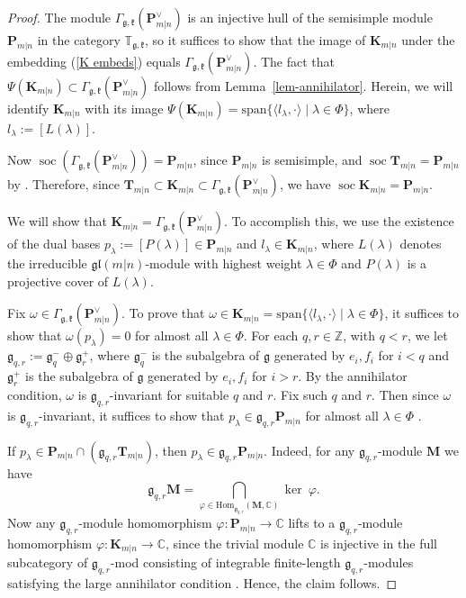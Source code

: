 \documentclass[12pt,oneside,english]{amsart}
\numberwithin{equation}{section}
\numberwithin{figure}{section}
\theoremstyle{plain}
\theoremstyle{plain}
\theoremstyle{remark}
\theoremstyle{definition}
\theoremstyle{plain}
\theoremstyle{remark}
\theoremstyle{definition}
\theoremstyle{plain}
\theoremstyle{plain}
\theoremstyle{definition}
\newcommand{\bT}{\mathbf{T}}
\newcommand{\bP}{\mathbf{P}}
\newcommand{\bK}{\mathbf{K}}
\newcommand{\bM}{\mathbf{M}}
\newcommand{\soc}{\operatorname{soc}}
\newcommand{\fg}{\mathfrak{g}}
\newcommand{\fk}{\mathfrak{k}}
\begin{document}
\begin{proof}

The module  $\Gamma_{\fg,\fk}(\bP_{m|n}^\vee)$  is an injective hull of the semisimple module $\bP_{m|n}$ in the category $\mathbb T_{\fg,\fk}$, so it suffices to show that the  image of  $\bK_{m|n}$ under the embedding (\ref{K embeds}) equals $\Gamma_{\fg,\fk}(\bP_{m|n}^\vee)$.
The fact that $\Psi(\bK_{m|n})\subset \Gamma_{\fg,\fk}(\bP_{m|n}^\vee)$ follows from Lemma~\ref{lem-annihilator}. Herein, we will identify $\bK_{m|n}$ with its image $\Psi(\bK_{m|n})=\mathrm{span}\{\langle l_{\lambda},\cdot\rangle\mid \lambda\in\Phi\}$, where $ l_\lambda:=[L(\lambda)]$.

Now $\soc(\Gamma_{\fg,\fk}(\bP_{m|n}^\vee))=\bP_{m|n}$, since $\bP_{m|n}$ is semisimple, and  $\soc\bT_{m|n}=\bP_{m|n}$ by \cite[Theorem 3.11]{CS}.
Therefore, since $\bT_{m|n}\subset\bK_{m|n}\subset\Gamma_{\fg,\fk}(\bP_{m|n}^\vee)$, we have $\soc\bK_{m|n}=\bP_{m|n}$.

We will show that  $\bK_{m|n}=\Gamma_{\fg,\fk}(\bP_{m|n}^\vee)$. To accomplish this, we  use the existence of the dual bases $p_\lambda:=[P(\lambda)]\in\bP_{m|n}$ and $l_\lambda\in\bK_{m|n}$, where
 $L(\lambda)$ denotes the irreducible $\mathfrak{gl}(m|n)$-module with highest weight $\lambda\in\Phi$ and $P(\lambda)$ is a projective cover of  $L(\lambda)$.

Fix $\omega\in \Gamma_{\fg,\fk}(\bP^{\vee}_{m|n})$. To prove that $\omega\in\bK_{m|n}=\mathrm{span}\{\langle l_{\lambda},\cdot\rangle\mid \lambda\in\Phi\}$, it suffices to show that $\omega(p_\lambda)=0$ for almost all $\lambda\in\Phi$.
For each $q,r\in\mathbb{Z}$, with $q<r$, we let $\fg_{q,r}:=\fg_{q}^-\oplus\fg_{r}^+$, where $\fg_{q}^-$ is the subalgebra of $\fg$ generated by $e_i,f_i$ for $i<q$ and $\fg_{r}^+$ is the subalgebra of $\fg$ generated by $e_i,f_i$ for $i>r$.
By the annihilator condition,  $\omega$ is $\mathfrak{g}_{q,r}$-invariant for suitable $q$ and $r$. Fix such $q$ and $r$. Then since   $\omega$ is $\mathfrak{g}_{q,r}$-invariant, it suffices to show that $p_\lambda\in\mathfrak{g}_{q,r}\bP_{m|n}$ for almost all $\lambda\in\Phi$ .

If  $p_\lambda\in\bP_{m|n}\cap(\mathfrak{g}_{q,r}\bT_{m|n})$, then  $p_\lambda\in\mathfrak{g}_{q,r}\bP_{m|n}$. Indeed, for any $\fg_{q,r}$-module $\bM$ we have
$$
\fg_{q,r}\bM=\bigcap_{\varphi\in\mathrm{Hom}_{\fg_{q,r}}(\bM,\mathbb{C})} \ker\ \varphi.
$$
Now any $\fg_{q,r}$-module homomorphism $\varphi:\bP_{m|n}\rightarrow\mathbb{C}$ lifts to a $\fg_{q,r}$-module  homomorphism $\varphi:\bK_{m|n}\rightarrow\mathbb{C}$, since the trivial module $\mathbb{C}$ is injective in the full subcategory of $\fg_{q,r}$-mod consisting of integrable finite-length $\fg_{q,r}$-modules satisfying the large annihilator condition \cite{DPS}. Hence, the claim follows.


\end{proof}
\end{document}
